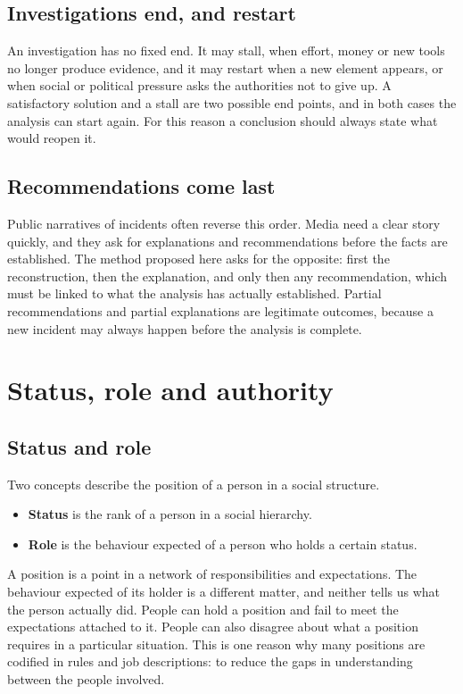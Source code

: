 \subsection{Investigations end, and restart}
An investigation has no fixed end. It may stall, when effort, money or new tools no longer produce evidence, and it may restart when a new element appears, or when social or political pressure asks the authorities not to give up. A satisfactory solution and a stall are two possible end points, and in both cases the analysis can start again. For this reason a conclusion should always state what would reopen it.

\subsection{Recommendations come last}
Public narratives of incidents often reverse this order. Media need a clear story quickly, and they ask for explanations and recommendations before the facts are established. The method proposed here asks for the opposite: first the reconstruction, then the explanation, and only then any recommendation, which must be linked to what the analysis has actually established. Partial recommendations and partial explanations are legitimate outcomes, because a new incident may always happen before the analysis is complete.

\section{Status, role and authority}

\subsection{Status and role}
Two concepts describe the position of a person in a social structure.
\begin{itemize}
	\item \textbf{Status} is the rank of a person in a social hierarchy.
	\item \textbf{Role} is the behaviour expected of a person who holds a certain status.
\end{itemize}

A position is a point in a network of responsibilities and expectations. The behaviour expected of its holder is a different matter, and neither tells us what the person actually did. People can hold a position and fail to meet the expectations attached to it. People can also disagree about what a position requires in a particular situation. This is one reason why many positions are codified in rules and job descriptions: to reduce the gaps in understanding between the people involved.


